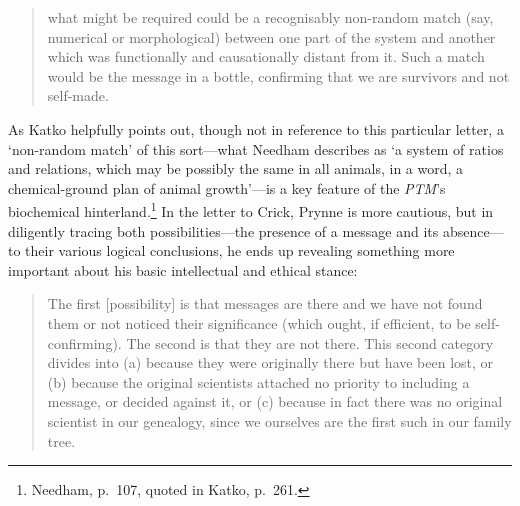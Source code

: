 \documentclass[]{article}
\begin{document}
\begin{quote}
what might be required could be a recognisably non-random match (say,
numerical or morphological) between one part of the system and another
which was functionally and causationally distant from it. Such a match
would be the message in a bottle, confirming that we are survivors and
not self-made.
\end{quote}

\noindent As Katko helpfully points out, though not in reference to this
particular letter, a `non-random match' of this sort---what Needham
describes as `a system of ratios and relations, which may be possibly
the same in all animals, in a word, a chemical-ground plan of animal
growth'---is a key feature of the \emph{PTM}'s biochemical
hinterland.\footnote{Needham, p.~107, quoted in Katko, p.~261.} In the
letter to Crick, Prynne is more cautious, but in diligently tracing both
possibilities---the presence of a message and its absence---to their
various logical conclusions, he ends up revealing something more
important about his basic intellectual and ethical stance:

\begin{quote}
The first {[}possibility{]} is that messages are there and we have not
found them or not noticed their significance (which ought, if efficient,
to be self-confirming). The second is that they are not there. This
second category divides into (a) because they were originally there but
have been lost, or (b) because the original scientists attached no
priority to including a message, or decided against it, or (c) because
in fact there was no original scientist in our genealogy, since we
ourselves are the first such in our family tree.
\end{quote}
\end{document}
